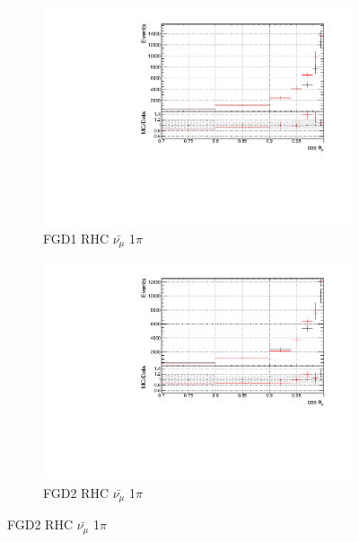 \begin{figure}[!h]
\begin{subfigure}{0.49\textwidth}
  \centering
  \includegraphics[width=\textwidth]{figs/prioronly1D_t_FGD1_anti-numuCC_1pi}
  \caption{FGD1 RHC $\bar{\nu_{\mu}}$ 1$\pi$}
\end{subfigure}
\centering
\begin{subfigure}{0.49\textwidth}
  \centering
  \includegraphics[width=\textwidth]{figs/prioronly1D_t_FGD2_anti-numuCC_1pi}
  \caption{FGD2 RHC $\bar{\nu_{\mu}}$ 1$\pi$}
\end{subfigure}


\end{figure}
